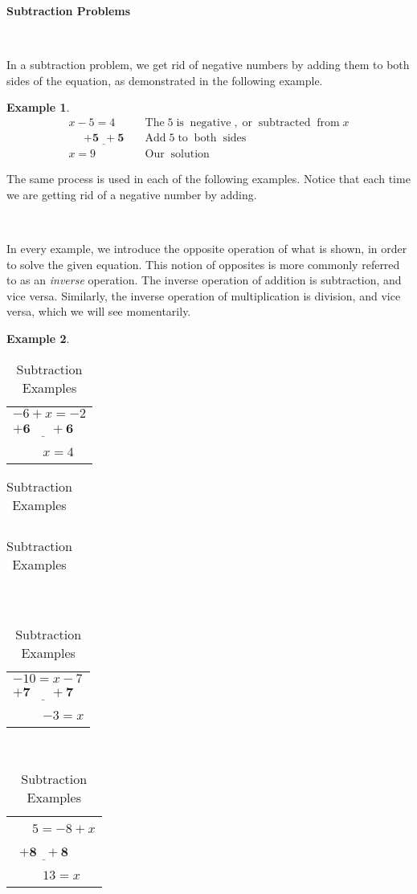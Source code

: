 \documentclass[11pt]{book}
\newcommand{\tmmathbf}[1]{\ensuremath{\boldsymbol{#1}}}
\newcommand{\tmop}[1]{\ensuremath{\operatorname{#1}}}
\theoremstyle{definition}  %
\newtheorem{example}{Example}[chapter]
\newcommand{\pp}{\par~\par}
\begin{document}

{\textbf{Subtraction Problems}}\par
~\par
In a subtraction problem, we get rid of negative numbers by adding them to
both sides of the equation, as demonstrated in the following example.

\begin{example}\label{Lin6}
  \begin{eqnarray*}
    x - 5 = 4~~~ &  & \tmop{The} 5 \tmop{is} \tmop{negative}, \tmop{or}
    \tmop{subtracted} \tmop{from} x\\
    ~~~~~~\tmmathbf{\underline{+ 5 ~~+ 5}} &  & \tmop{Add} 5 \tmop{to} \tmop{both}
    \tmop{sides}\\
    x = 9\qquad  &  & \tmop{Our} \tmop{solution}
  \end{eqnarray*}
\end{example}

The same process is used in each of the following examples. Notice that each time we are getting rid of a negative
number by adding.\pp
In every example, we introduce the opposite operation of what is shown, in order to solve the given equation.  This notion of opposites is more commonly referred to as an \textit{inverse} operation.  The inverse operation of addition is subtraction, and vice versa.  Similarly, the inverse operation of multiplication is division, and vice versa, which we will see momentarily.

\begin{example}\label{Lin7}
~\end{example}

  \begin{table}[h]
    \begin{tabular}{l}
      $- 6 + x = - 2$\\
      $\tmmathbf{\underline{+ 6 ~~~~~~~+ 6}}$\\
      ~~~~ $x = 4$
    \end{tabular} \begin{tabular}{l}
      
    \end{tabular}\begin{tabular}{l}
      
    \end{tabular} \ \ \ \ \ \ \ \ \ \ \ \ \ \ \ \ \ \ \begin{tabular}{l}
      $- 10 = x - 7$\\
      $ \tmmathbf{\underline{+ 7 ~~~~~~~+ 7}}$\\
      ~~~~ $- 3 = x$
    \end{tabular} \ \ \ \ \ \ \ \ \ \ \ \ \ \ \ \ \ \ \ \begin{tabular}{l}
      ~~~$5 = - 8 + x$\\
      ~$\tmmathbf{\underline{+ 8 ~~~+ 8}}$\\
      ~~~~ $13 = x$
    \end{tabular}
    \caption{Subtraction Examples}
  \end{table}
\end{document}
